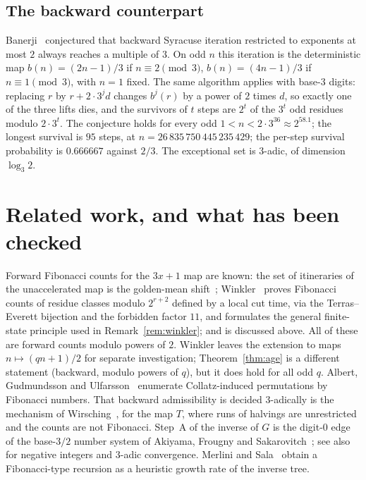 \documentclass[11pt]{article}
\begin{document}
\subsection*{The backward counterpart}
Banerji~\cite{Ba} conjectured that backward Syracuse iteration restricted to exponents at most $2$ always reaches
a multiple of $3$. On odd $n$ this iteration is the deterministic map $b(n)=(2n-1)/3$ if $n\equiv2\pmod3$,
$b(n)=(4n-1)/3$ if $n\equiv1\pmod3$, with $n=1$ fixed. The same algorithm applies with base-$3$ digits: replacing $r$
by $r+2\cdot3^{j}d$ changes $b^{j}(r)$ by a power of $2$ times $d$, so exactly one of the three lifts dies, and the
survivors of $t$ steps are $2^{t}$ of the $3^{t}$ odd residues modulo $2\cdot3^{t}$. The conjecture holds for every odd
$1<n<2\cdot3^{36}\approx2^{58.1}$; the longest survival is $95$ steps, at $n=26\,835\,750\,445\,235\,429$; the
per-step survival probability is $0.666667$ against $2/3$. The exceptional set is $3$-adic, of dimension $\log_3 2$.

\section{Related work, and what has been checked}\label{sec:related}

Forward Fibonacci counts for the $3x+1$ map are known: the set of itineraries of the unaccelerated map is the
golden-mean shift~\cite{Ge}; Winkler~\cite{Wk} proves Fibonacci counts of residue classes modulo $2^{r+2}$ defined by
a local cut time, via the Terras--Everett bijection and the forbidden factor $11$, and formulates the general
finite-state principle used in Remark~\ref{rem:winkler}; and \cite{RJ} is discussed above. All of these are forward
counts modulo powers of $2$. Winkler leaves the extension to maps $n\mapsto(qn+1)/2$ for separate investigation;
Theorem~\ref{thm:age} is a different statement (backward, modulo powers of $q$), but it does hold for all odd $q$. Albert, Gudmundsson and Ulfarsson~\cite{AGU} enumerate Collatz-induced permutations
by Fibonacci numbers. That backward admissibility is decided $3$-adically is the mechanism of
Wirsching~\cite{Wi}, for the map $T$, where runs of halvings are unrestricted and the counts are not Fibonacci.
Step~A of the inverse of $G$ is the digit-$0$ edge of the base-$3/2$ number system of Akiyama, Frougny and
Sakarovitch~\cite{AFS}; see also~\cite{FK} for negative integers and $3$-adic convergence. Merlini and
Sala~\cite{MS} obtain a Fibonacci-type recursion as a heuristic growth rate of the inverse tree.
\end{document}
